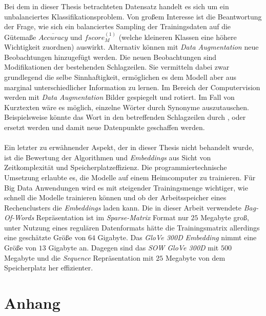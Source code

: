 \documentclass[a4paper,11pt]{article}
\begin{document}
Bei dem in dieser Thesis betrachteten Datensatz handelt es sich um ein unbalanciertes Klassifikationsproblem. Von großem Interesse ist die Beantwortung der Frage, wie sich ein balanciertes Sampling der Trainingsdaten auf die Gütemaße $\overline{Accuracy}$ und $fscore_M^{(1)}$ (welche kleineren Klassen eine höhere Wichtigkeit zuordnen) auswirkt. Alternativ können mit \textit{Data Augmentation} neue Beobachtungen hinzugefügt werden. Die neuen Beobachtungen sind Modifikationen der bestehenden Schlagzeilen. Sie vermitteln dabei zwar grundlegend die selbe Sinnhaftigkeit, ermöglichen es dem Modell aber aus marginal unterschiedlicher Information zu lernen. Im Bereich der Computervision werden mit \textit{Data Augmentation} Bilder gespiegelt und rotiert. Im Fall von Kurztexten wäre es möglich, einzelne Wörter durch Synonyme auszutauschen. Beispielsweise könnte das Wort  in den betreffenden Schlagzeilen durch ,  oder  ersetzt werden und damit neue Datenpunkte geschaffen werden.\\
\\
Ein letzter zu erwähnender Aspekt, der in dieser Thesis nicht behandelt wurde, ist die Bewertung der Algorithmen und \textit{Embeddings} aus Sicht von Zeitkomplexität und Speicherplatzeffizienz. Die programmiertechnische Umsetzung erlaubte es, die Modelle auf einem Heimcomputer zu trainieren. Für Big Data Anwendungen wird es mit steigender Trainingsmenge wichtiger, wie schnell die Modelle trainieren können und ob der Arbeitsspeicher eines Rechenclusters die \textit{Embeddings} laden kann. Die in dieser Arbeit verwendete \textit{Bag-Of-Words} Repräsentation ist im \textit{Sparse-Matrix} Format nur $25$ Megabyte groß, unter Nutzung eines regulären Datenformats hätte die Trainingsmatrix allerdings eine geschätzte Größe von $64$ Gigabyte. Das \textit{GloVe 300D} \textit{Embedding} nimmt eine Größe von $13$ Gigabyte an. Dagegen sind das \textit{SOW GloVe 300D} mit $500$ Megabyte und die \textit{Sequence} Repräsentation mit $25$ Megabyte von dem Speicherplatz her effizienter.


\newpage


\printbibliography[
heading=bibintoc,
title={Literaturverzeichnis}
]

\newpage


\appendix
\section{Anhang}
\end{document}
